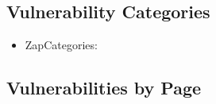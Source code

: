 \documentclass[12pt]{article}
\begin{document}
\subsection{Vulnerability Categories}
\begin{itemize}
\item ZapCategories:
\end{itemize}

\subsection{Vulnerabilities by Page}
\end{document}
